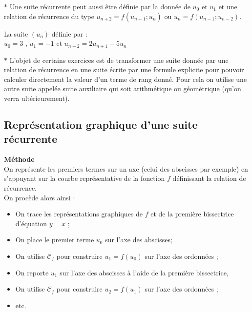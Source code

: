 \begin{enumerate}
\begin{remark}
 $ \ast $ Une suite récurrente peut aussi être définie par la donnée de $u_{0}$ et $u_{1}$ et une relation de récurrence du type $u_{n+2}=f(u_{n+1} ; u_{n})$  ou $u_{n}=f(u_{n-1} ; u_{n-2}).$
  \end{remark}
\begin{example} 
 La suite $ (u_{n})$ définie par : \\ $u_{0}=3 $ , $u_{1}= -1$  et  $ u_{n+2}= 2u_{n+1}-5u_{n} $
 \end{example}
 $ \ast $ L'objet de certains exercices est de transformer une suite  donnée par une relation de récurrence  en une suite écrite par une formule explicite pour pouvoir calculer directement la valeur d'un terme de rang donné. Pour cela on utilise une autre suite appelée suite auxiliaire qui soit arithmétique ou géométrique (qu'on verra ultérieurement). 
  
 
  \end{enumerate} 

 \subsection*{Représentation graphique d'une suite récurrente}
\textbf{\color{blue}Méthode}\\
 On  représente les premiers termes sur un axe (celui des abscisses par exemple) en s'appuyant sur la courbe représentative de la fonction  $ f $ définissant la relation de récurrence.\\
On procède alors ainsi :\\
\begin{itemize}
\item On trace les représentations graphiques de $ f$ et de la première bissectrice d'équation $ y = x $ ;
\item On place le premier terme  $ u_{0} $ sur l'axe des abscisses;
\item On utilise $\mathscr{C}_{f}$ pour construire $u_{1} = f (u_{0}) $ sur l'axe des ordonnées ;
\item On reporte  $u_{1}$ sur l'axe des abscisses à l'aide de la première bissectrice, 
\item On utilise $\mathscr{C}_{f}$  pour construire $u_{2} = f (u_{1}) $ sur l'axe des ordonnées ;
\item  etc.\\
\end{itemize}

